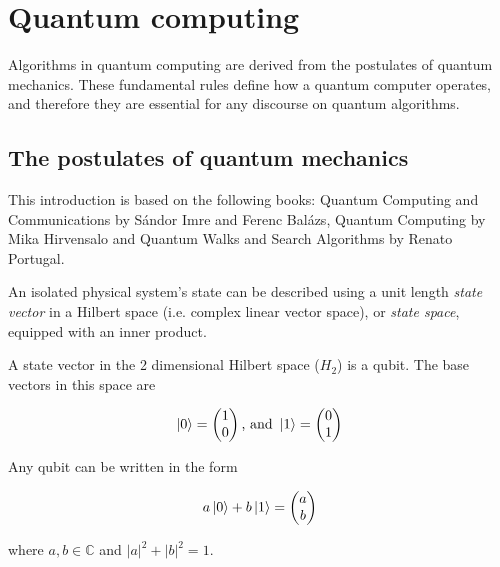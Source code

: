 \chapter{Quantum computing}

Algorithms in quantum computing are derived from the postulates of quantum mechanics. These fundamental rules define how a quantum computer operates, and therefore they are essential for any discourse on quantum algorithms.

\section{The postulates of quantum mechanics}

This introduction is based on the following books: Quantum Computing and Communications\cite{ImreSandor} by Sándor Imre and Ferenc Balázs, Quantum Computing\cite{Hirvensalo} by Mika Hirvensalo and Quantum Walks and Search Algorithms\cite{Portugal} by Renato Portugal.


An isolated physical system's state can be described using a unit length \textit{state vector} in a Hilbert space (i.e. complex linear vector space), or \textit{state space}, equipped with an inner product.

 A state vector in the 2 dimensional Hilbert space ($H_2$) is a qubit. The base vectors in this space are

\begin{align*}
\ket{0} = \begin{pmatrix} 1 \\ 0 \end{pmatrix} \text{, and } \ket{1} = \begin{pmatrix} 0 \\ 1 \end{pmatrix}
\end{align*}

Any qubit can be written in the form

\begin{align*}
a\ket{0} + b\ket{1} = \begin{pmatrix} a \\ b \end{pmatrix}
\end{align*}

where $a, b \in{} \mathds{C}$ and $|a|^2 + |b|^2 = 1$.


